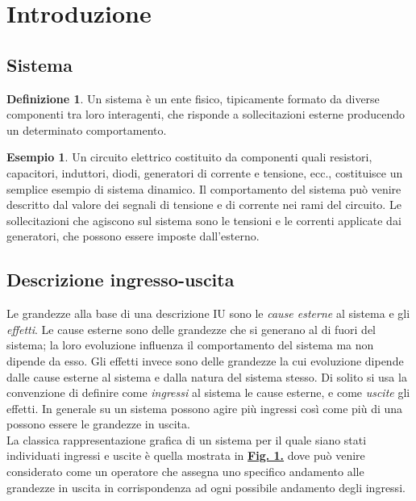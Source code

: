 \documentclass[a4paper]{article}
\theoremstyle{definition}
\newtheorem{exmp}{Esempio}[section]
\newtheorem{defn}{Definizione}[subsection]
\begin{document}
	\begin{frontespizio}
		\Titoletto{}
	\end{frontespizio}
	
	\tableofcontents
	
	\newpage
	
	\section{Introduzione}
	
	\subsection{Sistema}
		\begin{defn}
			Un sistema è un ente fisico, tipicamente formato da diverse componenti tra
			loro interagenti, che risponde a sollecitazioni esterne producendo un determinato
			comportamento.
		\end{defn}
		
		\begin{exmp}
			Un circuito elettrico costituito da componenti quali resistori, capacitori, induttori, diodi, generatori di corrente e tensione, ecc., costituisce un semplice esempio di sistema dinamico. Il comportamento del sistema può venire descritto dal valore dei segnali di tensione e di corrente nei rami del circuito. Le sollecitazioni che agiscono sul sistema sono le tensioni e le correnti applicate dai generatori, che
			possono essere imposte dall'esterno.
		\end{exmp}
		
	\subsection{Descrizione ingresso-uscita}
		Le grandezze alla base di una descrizione IU sono le \textit{cause esterne} al sistema e gli
		\textit{effetti}. Le cause esterne sono delle grandezze che si generano al di fuori del sistema;
		la loro evoluzione influenza il comportamento del sistema ma non dipende da esso.
		Gli effetti invece sono delle grandezze la cui evoluzione dipende dalle cause esterne
		al sistema e dalla natura del sistema stesso. Di solito si usa la convenzione di definire
		come \textit{ingressi} al sistema le cause esterne, e come \textit{uscite} gli effetti. In generale su un
		sistema possono agire più ingressi così come più di una possono essere le grandezze
		in uscita. \\
		La classica rappresentazione grafica di un sistema per il quale siano stati
		individuati ingressi e uscite è quella mostrata in \hyperref[fig:io]{\textbf{Fig. 1.}} dove può venire
		considerato come un operatore che assegna uno specifico andamento alle grandezze
		in uscita in corrispondenza ad ogni possibile andamento degli ingressi.
		
\end{document}
